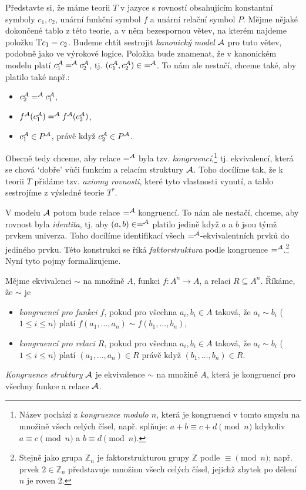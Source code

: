 Představte si, že máme teorii $T$ v jazyce s rovností obsahujícím konstantní symboly $c_1,c_2$, unární funkční symbol $f$ a unární relační symbol $P$. Mějme nějaké dokončené tablo z této teorie, a v něm bezespornou větev, na kterém najdeme položku $\mathrm{T} c_1=c_2$. Budeme chtít sestrojit \emph{kanonický model} $\mathcal{A}$ pro tuto větev, podobně jako ve výrokové logice. Položka bude znamenat, že v kanonickém modelu platí $c_1^{\mathcal{A}} =^{\mathcal{A}} c_2^{\mathcal{A}}$, tj. $(c_1^{\mathcal{A}},c_2^{\mathcal{A}})\in {=^{\mathcal{A}}}$. To nám ale nestačí, chceme také, aby platilo také např.:
\begin{itemize}
    \item $c_2^{\mathcal{A}} =^{\mathcal{A}} c_1^{\mathcal{A}}$,
    \item $f^{\mathcal{A}}(c_1^{\mathcal{A}}) =^{\mathcal{A}} f^{\mathcal{A}}(c_2^{\mathcal{A}})$,
    \item $c_1^{\mathcal{A}}\in P^{\mathcal{A}}$, právě když $c_2^{\mathcal{A}}\in P^{\mathcal{A}}$.
\end{itemize}
Obecně tedy chceme, aby relace $=^{\mathcal{A}}$ byla tzv. \emph{kongruencí},\footnote{Název pochází z \emph{kongruence modulo $n$}, která je kongruencí v tomto smyslu na množině všech celých čísel, např. splňuje: $a+b\equiv c+d\pmod n$ kdykoliv $a\equiv c\pmod n$ a $b\equiv d\pmod n$.} tj. ekvivalencí, která se chová `dobře' vůči funkcím a relacím struktury $\mathcal{A}$. Toho docílíme tak, že k teorii $T$ přidáme tzv. \emph{axiomy rovnosti}, které tyto vlastnosti vynutí, a tablo sestrojíme z výsledné teorie $T^*$.

V modelu $\mathcal{A}$ potom bude relace $=^{\mathcal{A}}$ kongruencí. To nám ale nestačí, chceme, aby rovnost byla \emph{identita}, tj. aby $(a,b)\in=^{\mathcal{A}}$ platilo jedině když $a$ a $b$ jsou týmž prvkem univerza. Toho docílíme identifikací všech $=^{\mathcal{A}}$-ekvivalentních prvků do jediného prvku. Této konstrukci se říká \emph{faktorstruktura} podle kongruence $=^{\mathcal{A}}$.\footnote{Stejně jako grupa $\mathbb Z_n$ je faktorstrukturou grupy $\mathbb Z$ podle $\equiv\pmod n$; např. prvek $2\in\mathbb Z_n$ představuje množinu všech celých čísel, jejichž zbytek po dělení $n$ je roven 2.} Nyní tyto pojmy formalizujeme.

\begin{definition}[Kongruence]
    Mějme ekvivalenci $\sim$ na množině $A$, funkci $f\colon A^n\to A$, a relaci $R\subseteq A^n$. Říkáme, že $\sim$ je
    \begin{itemize}
        \item \emph{kongruencí pro funkci $f$}, pokud pro všechna $a_i,b_i\in A$ taková, že $a_i\sim b_i$ ($1\leq i\leq n$) platí $f(a_1,\dots,a_n)\sim f(b_1,\dots,b_n)$,
        \item \emph{kongruencí pro relaci $R$}, pokud pro všechna $a_i,b_i\in A$ taková, že $a_i\sim b_i$ ($1\leq i\leq n$) platí $(a_1,\dots,a_n)\in R$ právě když $(b_1,\dots,b_n)\in R$.
    \end{itemize}    
    \emph{Kongruence struktury} $\mathcal{A}$ je ekvivalence $\sim$ na množině $A$, která je kongruencí pro všechny funkce a relace $\mathcal{A}$. 
\end{definition}

